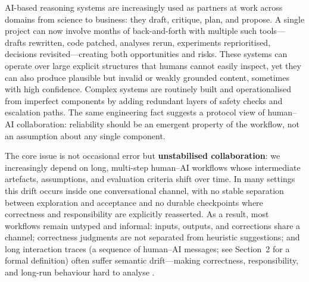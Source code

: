 \documentclass[preprints,accept]{Definitions/mdpi}
\theoremstyle{definition}
\begin{document}

\noindent
AI-based reasoning systems are increasingly used as partners at work across domains from science to business: they draft, critique, plan, and propose. A single project can now involve months of back-and-forth with multiple such tools---drafts rewritten, code patched, analyses rerun, experiments reprioritised, decisions revisited---creating both opportunities and risks. These systems can operate over large explicit structures that humans cannot easily inspect, yet they can also produce plausible but invalid or weakly grounded content, sometimes with high confidence.  Complex systems are routinely built and operationalised from imperfect components by adding redundant layers of safety checks and escalation paths\cite{nrc_defense_in_depth_glossary,iaea_insag10_defence_in_depth_1996,reason_human_error_models_management_2000,reason_latent_human_failures_complex_systems_1990}. The same engineering fact suggests a protocol view of human--AI collaboration: reliability should be an emergent property of the workflow, not an assumption about any single component.

\smallskip
\noindent
The core issue is not occasional error but \textbf{unstabilised collaboration}: we increasingly depend on long, multi-step human--AI workflows whose intermediate artefacts, assumptions, and evaluation criteria shift over time. In many settings this drift occurs inside one conversational channel, with no stable separation between exploration and acceptance and no durable checkpoints where correctness and responsibility are explicitly reasserted. As a result, most workflows remain untyped and informal: inputs, outputs, and corrections share a channel; correctness judgments are not separated from heuristic suggestions; and long interaction traces (a sequence of human--AI messages; see Section~2 for a formal definition) often suffer semantic drift---making correctness, responsibility, and long-run behaviour hard to analyse \cite{laban_llms_get_lost_multiturn_2025,dongre_drift_no_more_context_equilibria_2025,arike_evaluating_goal_drift_agents_2025,choi_identity_drift_llm_agents_2024}.
\end{document}
